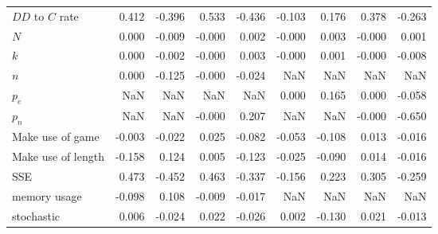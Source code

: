 \begin{tabular}{lrrrrrrrr}
$DD$ to $C$ rate     &            0.412 &        -0.396 &            0.533 &        -0.436 &           -0.103 &         0.176 &            0.378 &        -0.263 \\
$N$                  &            0.000 &        -0.009 &           -0.000 &         0.002 &           -0.000 &         0.003 &           -0.000 &         0.001 \\
$k$                  &            0.000 &        -0.002 &           -0.000 &         0.003 &           -0.000 &         0.001 &           -0.000 &        -0.008 \\
$n$                  &            0.000 &        -0.125 &           -0.000 &        -0.024 &              NaN &           NaN &              NaN &           NaN \\
$p_e$                &              NaN &           NaN &              NaN &           NaN &            0.000 &         0.165 &            0.000 &        -0.058 \\
$p_n$                &              NaN &           NaN &           -0.000 &         0.207 &              NaN &           NaN &           -0.000 &        -0.650 \\
Make use of game     &           -0.003 &        -0.022 &            0.025 &        -0.082 &           -0.053 &        -0.108 &            0.013 &        -0.016 \\
Make use of length   &           -0.158 &         0.124 &            0.005 &        -0.123 &           -0.025 &        -0.090 &            0.014 &        -0.016 \\
SSE                  &            0.473 &        -0.452 &            0.463 &        -0.337 &           -0.156 &         0.223 &            0.305 &        -0.259 \\
memory usage         &           -0.098 &         0.108 &           -0.009 &        -0.017 &              NaN &           NaN &              NaN &           NaN \\
stochastic           &            0.006 &        -0.024 &            0.022 &        -0.026 &            0.002 &        -0.130 &            0.021 &        -0.013 \\
\bottomrule
\end{tabular}
